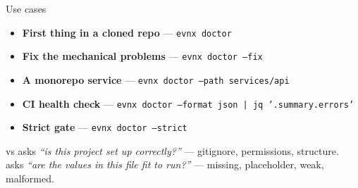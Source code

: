 \begin{frame}{Use cases}
  \begin{itemize}
    \item \textbf{First thing in a cloned repo} — \texttt{evnx doctor}
    \item \textbf{Fix the mechanical problems} — \texttt{evnx doctor --fix}
    \item \textbf{A monorepo service} — \texttt{evnx doctor --path services/api}
    \item \textbf{CI health check} — \texttt{evnx doctor --format json | jq '.summary.errors'}
    \item \textbf{Strict gate} — \texttt{evnx doctor --strict}
  \end{itemize}

  \vspace{1em}
  \begin{block}{ vs }
     asks \emph{``is this project set up correctly?''} —
    gitignore, permissions, structure.\\
     asks \emph{``are the values in this file fit to run?''} —
    missing, placeholder, weak, malformed.
  \end{block}
\end{frame}
